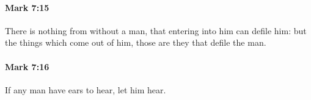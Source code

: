 		\paragraph{Mark 7:15} %
			\label{MARK-7-15}

			There is nothing from without a man, that entering into him can defile him: but the things which come out of him, those are they that defile the man.

			\begin{framed}
			\scriptsize
				\begin{compactdesc}
					\item[SBLG] 
				\end{compactdesc}
			\end{framed}

		\paragraph{Mark 7:16} %
			\label{MARK-7-16}

			If any man have ears to hear, let him hear.

			\begin{framed}
			\scriptsize
				\begin{compactdesc}
					\item[SBLG] \gr{}
				\end{compactdesc}
			\end{framed}


